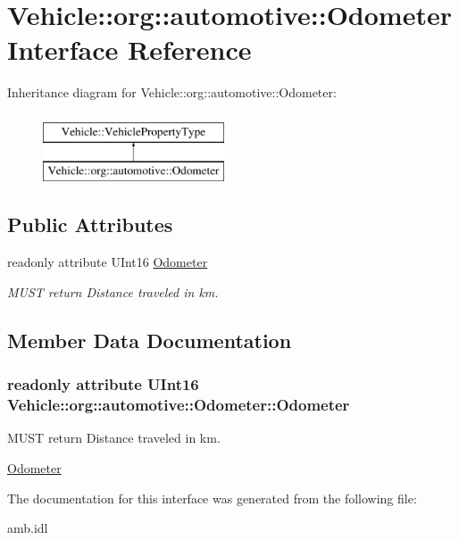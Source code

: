 \hypertarget{interfaceVehicle_1_1org_1_1automotive_1_1Odometer}{\section{Vehicle\-:\-:org\-:\-:automotive\-:\-:Odometer Interface Reference}
\label{interfaceVehicle_1_1org_1_1automotive_1_1Odometer}
}
Inheritance diagram for Vehicle\-:\-:org\-:\-:automotive\-:\-:Odometer\-:\begin{figure}[H]
\begin{center}
\leavevmode
\includegraphics[height=2.000000cm]{interfaceVehicle_1_1org_1_1automotive_1_1Odometer}
\end{center}
\end{figure}
\subsection*{Public Attributes}
\begin{DoxyCompactItemize}
\item 
readonly attribute U\-Int16 \hyperlink{interfaceVehicle_1_1org_1_1automotive_1_1Odometer_ad3836846b9c5a143206b01f113c7a85a}{Odometer}
\begin{DoxyCompactList}\small\item\em M\-U\-S\-T return Distance traveled in km. \end{DoxyCompactList}\end{DoxyCompactItemize}


\subsection{Member Data Documentation}
\hypertarget{interfaceVehicle_1_1org_1_1automotive_1_1Odometer_ad3836846b9c5a143206b01f113c7a85a}{
\subsubsection[{Odometer}]{\setlength{\rightskip}{0pt plus 5cm}readonly attribute U\-Int16 Vehicle\-::org\-::automotive\-::\-Odometer\-::\-Odometer}}\label{interfaceVehicle_1_1org_1_1automotive_1_1Odometer_ad3836846b9c5a143206b01f113c7a85a}


M\-U\-S\-T return Distance traveled in km. 

\hyperlink{interfaceVehicle_1_1org_1_1automotive_1_1Odometer}{Odometer} 

The documentation for this interface was generated from the following file\-:\begin{DoxyCompactItemize}
\item 
amb.\-idl\end{DoxyCompactItemize}
